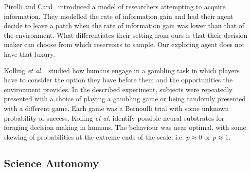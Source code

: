  


Pirolli and Card~\cite{pirolli1999information} introduced a model of researchers attempting to
acquire information.  They modelled the rate of information gain and had their
agent decide to leave a patch when the rate of information gain
was lower than that of the environment.  What differentiates their setting from
ours is that their decision maker can choose from which reservoirs to sample.  Our exploring agent does not have that luxury.


Kolling \emph{et al.}~\cite{kolling2012neural} studied how humans engage in a gambling task in which players have to consider the option they have before them and the opportunities
the environment provides.  In the described experiment, subjects were repeatedly
presented with a choice of playing a gambling game or being randomly presented
with a different game.  Each game was a Bernoulli trial with some unknown
probability of success.  Kolling \emph{et al.} identify possible neural
substrates for foraging decision making in humans.  The behaviour was near
optimal, with some skewing of probabilities at the extreme ends of the scale,
i.e. $p \approx 0$ or $p \approx 1$.


\subsection{Science Autonomy}

